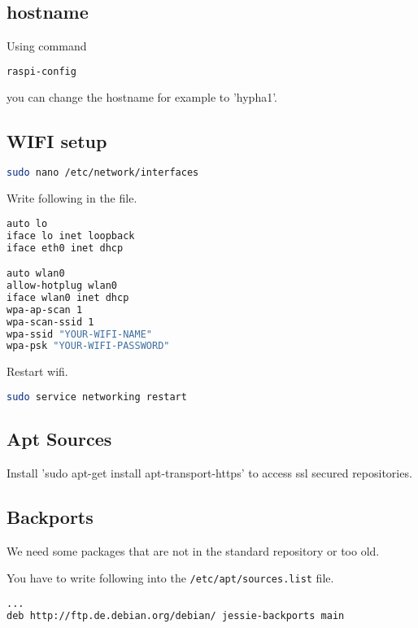 \documentclass[german,a4paper,11pt]{report}
\begin{document}
\subsection{hostname}
Using command
\begin{lstlisting}[language=bash,caption={raspi-config}]
raspi-config
\end{lstlisting}
you can change the hostname for example to 'hypha1'.

\subsection{WIFI setup}

\begin{lstlisting}[language=bash,caption={interfaces}]
sudo nano /etc/network/interfaces
\end{lstlisting}
Write following in the file.

\begin{lstlisting}[language=bash,caption={/etc/network/interfaces}]
auto lo
iface lo inet loopback
iface eth0 inet dhcp

auto wlan0
allow-hotplug wlan0
iface wlan0 inet dhcp
wpa-ap-scan 1
wpa-scan-ssid 1
wpa-ssid "YOUR-WIFI-NAME"
wpa-psk "YOUR-WIFI-PASSWORD"
\end{lstlisting}

Restart wifi.
\begin{lstlisting}[language=bash,caption={restart interfaces}]
sudo service networking restart
\end{lstlisting}

\subsection{Apt Sources}
Install 'sudo apt-get install apt-transport-https'
to access ssl secured repositories.

\subsection{Backports}
We need some packages that are not in the standard repository or too old.

You have to write following into the \texttt{/etc/apt/sources.list} file.

\begin{lstlisting}[language=bash,caption={/etc/apt/sources.list}]
...
deb http://ftp.de.debian.org/debian/ jessie-backports main
\end{lstlisting}
\end{document}
